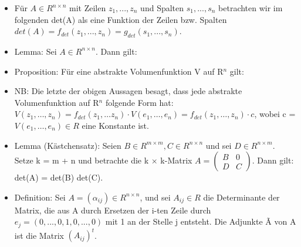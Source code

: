 \begin{itemize}
\item Für $A \in R^{n \times n}$ mit Zeilen $z_1, ..., z_n$ und Spalten $s_1, ..., s_n$ betrachten wir im folgenden det(A) als eine Funktion der Zeilen bzw. Spalten $det(A) = f_{det}(z_1,..., z_n) = g_{det}(s_1, ..., s_n)$.
\item Lemma: Sei $A \in R^{n \times n}$. Dann gilt:
\item Proposition: Für eine abstrakte Volumenfunktion V auf R$^n$ gilt:
\item NB: Die letzte der obigen Aussagen besagt, dass jede abstrakte Volumenfunktion auf R$^n$ folgende Form hat:
$V (z_1, …, z_n) = f_{det}(z_1, … z_n) \cdot V (e_1, …, e_n) = f_{det}(z_1, …, z_n) \cdot c$, wobei c = $V (e_1,…, e_n) \in R$ eine Konstante ist.
\item Lemma (Kästchensatz): Seien $B \in R^{m \times m},C \in R^{n \times n}$ und sei $D \in R^{n \times m}$. Setze k = m + n und betrachte die k $\times$ k-Matrix $A = \begin{pmatrix} B & 0 \\ D & C \end{pmatrix}$. Dann gilt: det(A) = det(B) det(C).
\item Definition: Sei $A = (\alpha_{ij}) \in R^{n \times n}$, und sei $A_{ij} \in R$ die Determinante der Matrix, die aus A durch Ersetzen der i-ten Zeile durch $e_j = (0,...,0,1,0,...,0)$ mit 1 an der Stelle j entsteht. Die Adjunkte \~{A} von A ist die Matrix $(A_{ij})^t$.\\

\end{itemize}
